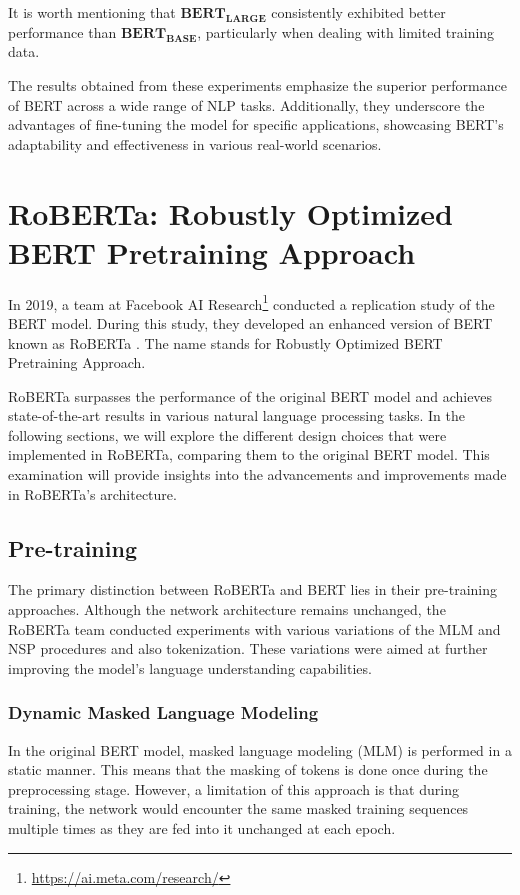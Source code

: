 \documentclass[a4paper,10pt]{report} %
\begin{document}
It is worth mentioning that $\mathbf{BERT_{LARGE}}$ consistently exhibited better performance than $\mathbf{BERT_{BASE}}$, particularly when dealing with limited training data.

The results obtained from these experiments emphasize the superior performance of BERT across a wide range of NLP tasks. Additionally, they underscore the advantages of fine-tuning the model for specific applications, showcasing BERT's adaptability and effectiveness in various real-world scenarios. \cite{bert}

\section{RoBERTa: Robustly Optimized BERT Pretraining Approach}
In 2019, a team at Facebook AI Research\footnote{\url{https://ai.meta.com/research/}} conducted a replication study of the BERT model. During this study, they developed an enhanced version of BERT known as RoBERTa \cite{roberta}. The name stands for Robustly Optimized BERT Pretraining Approach.

RoBERTa surpasses the performance of the original BERT model and achieves state-of-the-art results in various natural language processing tasks. In the following sections, we will explore the different design choices that were implemented in RoBERTa, comparing them to the original BERT model. This examination will provide insights into the advancements and improvements made in RoBERTa's architecture.

\subsection{Pre-training}
The primary distinction between RoBERTa and BERT lies in their pre-training approaches. Although the network architecture remains unchanged, the RoBERTa team conducted experiments with various variations of the MLM and NSP procedures and also tokenization. These variations were aimed at further improving the model's language understanding capabilities. \cite{roberta}

\subsubsection{Dynamic Masked Language Modeling}
In the original BERT model, masked language modeling (MLM) is performed in a static manner. This means that the masking of tokens is done once during the preprocessing stage. However, a limitation of this approach is that during training, the network would encounter the same masked training sequences multiple times as they are fed into it unchanged at each epoch.
\end{document}
